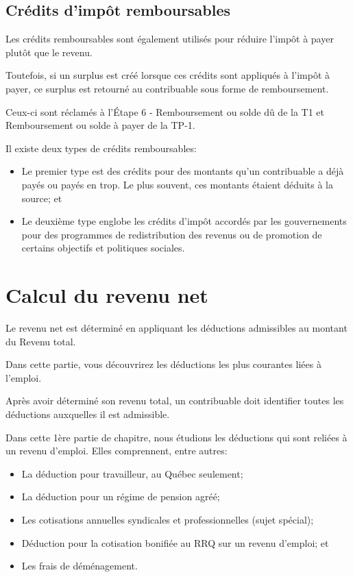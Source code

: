 \subsection{Crédits d'impôt remboursables}
Les crédits remboursables sont également utilisés pour réduire l'impôt à payer plutôt que le revenu. 

Toutefois, si un surplus est créé lorsque ces crédits sont appliqués à l'impôt à payer, ce surplus est retourné au contribuable sous forme de remboursement. 

Ceux-ci sont réclamés à l'Étape 6 - \og Remboursement ou solde dû \fg{} de la T1 et \og Remboursement ou solde à payer \fg{} de la TP-1. 

Il existe deux types de crédits remboursables: 
\begin{itemize}
	\item Le premier type est des crédits pour des montants qu'un contribuable a déjà payés ou payés en trop. Le plus souvent, ces montants étaient déduits à la source; et
	\item Le deuxième type englobe les crédits d'impôt accordés par les gouvernements pour des programmes de redistribution des revenus ou de promotion de certains objectifs et politiques sociales.
\end{itemize}



\section{Calcul du revenu net}
\begin{intro}
	Le revenu net est déterminé en appliquant les déductions admissibles au montant du Revenu total. 
	
	Dans cette partie, vous découvrirez les déductions les plus courantes liées à l'emploi.
\end{intro}
Après avoir déterminé son revenu total, un contribuable doit identifier toutes les déductions auxquelles il est admissible.

Dans cette 1ère partie de chapitre, nous étudions les déductions qui sont reliées à un revenu d'emploi. Elles comprennent, entre autres:
\begin{itemize}
	\item La déduction pour travailleur, au Québec seulement;
	\item La déduction pour un régime de pension agréé;
	\item Les cotisations annuelles syndicales et professionnelles (sujet spécial);
	\item Déduction pour la cotisation bonifiée au RRQ sur un revenu d'emploi; et
	\item Les frais de déménagement.
\end{itemize}

